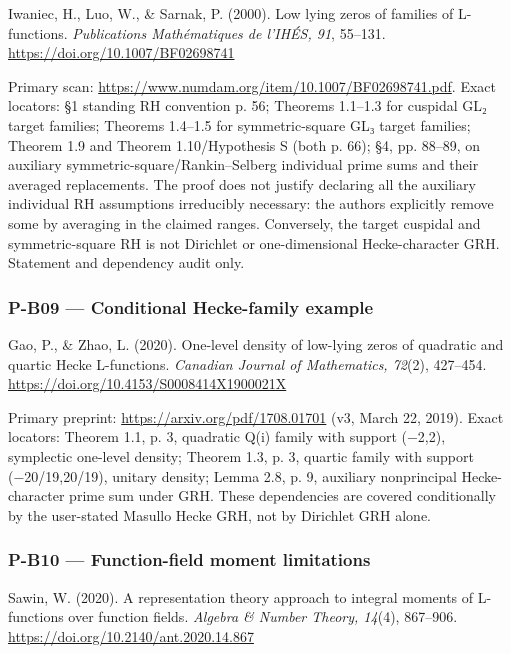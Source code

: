 \documentclass[11pt,a4paper]{article}
\theoremstyle{definition}\newtheorem{definition}{Definition}
\begin{document}
Iwaniec, H., Luo, W., \& Sarnak, P. (2000). Low lying zeros of families
of L-functions. \emph{Publications Mathématiques de l'IHÉS, 91},
55--131. \url{https://doi.org/10.1007/BF02698741}

Primary scan: \url{https://www.numdam.org/item/10.1007/BF02698741.pdf}.
Exact locators: §1 standing RH convention p. 56; Theorems 1.1--1.3 for
cuspidal GL₂ target families; Theorems 1.4--1.5 for symmetric-square GL₃
target families; Theorem 1.9 and Theorem 1.10/Hypothesis S (both p. 66);
§4, pp. 88--89, on auxiliary symmetric-square/Rankin--Selberg individual
prime sums and their averaged replacements. The proof does not justify
declaring all the auxiliary individual RH assumptions irreducibly
necessary: the authors explicitly remove some by averaging in the
claimed ranges. Conversely, the target cuspidal and symmetric-square RH
is not Dirichlet or one-dimensional Hecke-character GRH. Statement and
dependency audit only.

\subsubsection{P-B09 --- Conditional Hecke-family
example}\label{p-b09--conditional-hecke-family-example}

Gao, P., \& Zhao, L. (2020). One-level density of low-lying zeros of
quadratic and quartic Hecke L-functions. \emph{Canadian Journal of
Mathematics, 72}(2), 427--454.
\url{https://doi.org/10.4153/S0008414X1900021X}

Primary preprint: \url{https://arxiv.org/pdf/1708.01701} (v3, March 22,
2019). Exact locators: Theorem 1.1, p. 3, quadratic Q(i) family with
support (−2,2), symplectic one-level density; Theorem 1.3, p. 3, quartic
family with support (−20/19,20/19), unitary density; Lemma 2.8, p. 9,
auxiliary nonprincipal Hecke-character prime sum under GRH. These
dependencies are covered conditionally by the user-stated Masullo Hecke
GRH, not by Dirichlet GRH alone.

\subsubsection{P-B10 --- Function-field moment
limitations}\label{p-b10--function-field-moment-limitations}

Sawin, W. (2020). A representation theory approach to integral moments
of L-functions over function fields. \emph{Algebra \& Number Theory,
14}(4), 867--906. \url{https://doi.org/10.2140/ant.2020.14.867}
\end{document}
